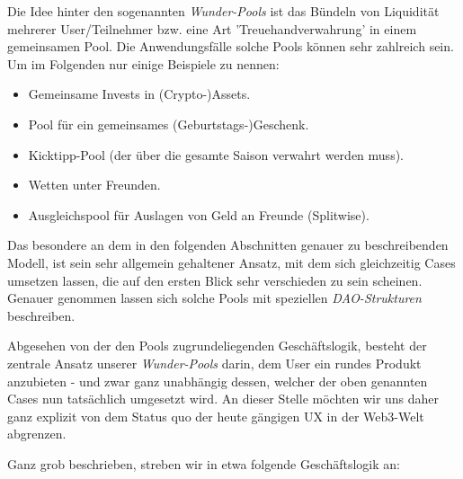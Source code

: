 
Die Idee hinter den sogenannten \textit{Wunder-Pools} ist das Bündeln von Liquidität mehrerer User/Teilnehmer bzw. eine Art 'Treuehandverwahrung' in einem gemeinsamen Pool. Die Anwendungsfälle solche Pools können sehr zahlreich sein. Um im Folgenden nur einige Beispiele zu nennen:  

\begin{itemize}
  \item Gemeinsame Invests in (Crypto-)Assets.
  \item Pool für ein gemeinsames (Geburtstags-)Geschenk.
  \item Kicktipp-Pool (der über die gesamte Saison verwahrt werden muss).
  \item Wetten unter Freunden.
  \item Ausgleichspool für Auslagen von Geld an Freunde (Splitwise).
\end{itemize}

\vspace{0.2cm}

Das besondere an dem in den folgenden Abschnitten genauer zu beschreibenden Modell, ist sein sehr allgemein gehaltener Ansatz, mit dem sich gleichzeitig Cases umsetzen lassen, die auf den ersten Blick sehr verschieden zu sein scheinen. Genauer genommen lassen sich solche Pools mit speziellen \textit{DAO-Strukturen} beschreiben.

Abgesehen von der den Pools zugrundeliegenden Geschäftslogik, besteht der zentrale Ansatz unserer \textit{Wunder-Pools} darin, dem User ein rundes Produkt anzubieten - und zwar ganz unabhängig dessen, welcher der oben genannten Cases nun tatsächlich umgesetzt wird. An dieser Stelle möchten wir uns daher ganz explizit von dem Status quo der heute gängigen UX in der Web3-Welt abgrenzen.

\vspace{0.2cm}

Ganz grob beschrieben, streben wir in etwa folgende Geschäftslogik an:

